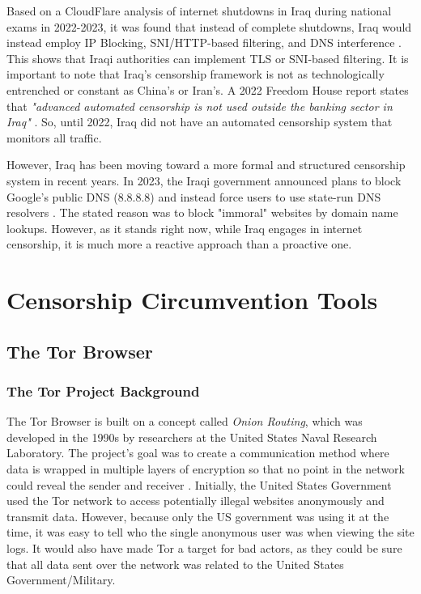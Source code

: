 Based on a CloudFlare analysis of internet shutdowns in Iraq during national exams in 2022-2023, it was found that instead of complete shutdowns, Iraq would instead employ IP Blocking, SNI/HTTP-based filtering, and DNS interference \cite{CloudFlareIraqExamShutdown}. This shows that Iraqi authorities can implement TLS or SNI-based filtering. It is important to note that Iraq's censorship framework is not as technologically entrenched or constant as China's or Iran's. A 2022 Freedom House report states that \textit{"advanced automated censorship is not used outside the banking sector in Iraq"} \cite{freedomhouseIraqFreedom}. So, until 2022, Iraq did not have an automated censorship system that monitors all traffic. 

However, Iraq has been moving toward a more formal and structured censorship system in recent years. In 2023, the Iraqi government announced plans to block Google's public DNS (8.8.8.8) and instead force users to use state-run DNS resolvers \cite{smexGooglesDNSIraq}. The stated reason was to block "immoral" websites by domain name lookups. However, as it stands right now, while Iraq engages in internet censorship, it is much more a reactive approach than a proactive one. 

\section{Censorship Circumvention Tools}

\subsection{The Tor Browser}

\subsubsection{The Tor Project Background}

The Tor Browser is built on a concept called \textit{Onion Routing}, which was developed in the 1990s by researchers at the United States Naval Research Laboratory. The project's goal was to create a communication method where data is wrapped in multiple layers of encryption so that no point in the network could reveal the sender and receiver \cite{torprojectProjectPrivacy}. Initially, the United States Government used the Tor network to access potentially illegal websites anonymously and transmit data. However, because only the US government was using it at the time, it was easy to tell who the single anonymous user was when viewing the site logs. It would also have made Tor a target for bad actors, as they could be sure that all data sent over the network was related to the United States Government/Military.

